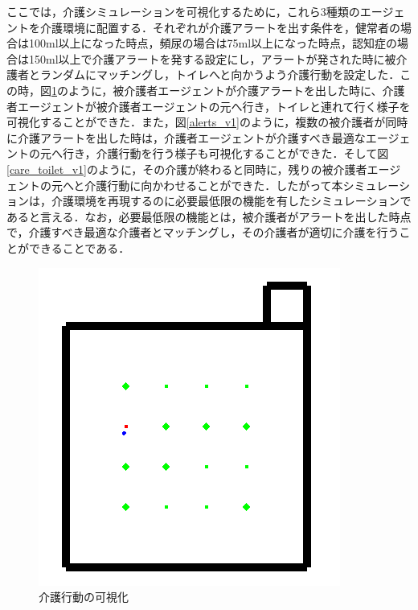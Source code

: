ここでは，介護シミュレーションを可視化するために，これら3種類のエージェントを介護環境に配置する．それぞれが介護アラートを出す条件を，健常者の場合は100ml以上になった時点，頻尿の場合は75ml以上になった時点，認知症の場合は150ml以上で介護アラートを発する設定にし，アラートが発された時に被介護者とランダムにマッチングし，トイレへと向かうよう介護行動を設定した．この時，図\ref{care_alert_v1}のように，被介護者エージェントが介護アラートを出した時に、介護者エージェントが被介護者エージェントの元へ行き，トイレと連れて行く様子を可視化することができた．また，図\ref{alerts_v1}のように，複数の被介護者が同時に介護アラートを出した時は，介護者エージェントが介護すべき最適なエージェントの元へ行き，介護行動を行う様子も可視化することができた．そして図\ref{care_toilet_v1}のように，その介護が終わると同時に，残りの被介護者エージェントの元へと介護行動に向かわせることができた．したがって本シミュレーションは，介護環境を再現するのに必要最低限の機能を有したシミュレーションであると言える．なお，必要最低限の機能とは，被介護者がアラートを出した時点で，介護すべき最適な介護者とマッチングし，その介護者が適切に介護を行うことができることである．

\begin{figure}[htb]
\begin{center}
 \includegraphics[scale=0.5]{figures/care_alert_v1.png}
 \caption[介護行動の可視化]{介護行動の可視化 \label{care_alert_v1}}
\end{center}
\end{figure}

